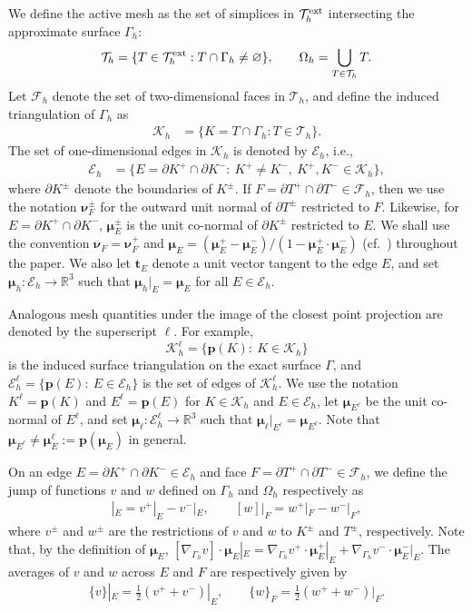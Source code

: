 \documentclass[10pt, a4paper]{amsart}
\newcommand{\bt}{{\bm t}}
\newcommand{\bp}{{\bm p}}
\newcommand{\bbR}{\mathbb{R}}
\newcommand{\p}{\partial}
\newcommand{\nab}{\nabla}
\newcommand{\bmu}{{\bm \mu}}
\newcommand{\calT}{\mathcal{T}}
\newcommand{\calE}{\mathcal{E}}
\newcommand{\calF}{\mathcal{F}}
\newcommand{\calK}{\mathcal{K}}
\newcommand{\bnu}{{\bm \nu}}
\theoremstyle{definition}
\theoremstyle{remark}
\theoremstyle{example}
\numberwithin{equation}{section}
\begin{document}
 We define the active mesh as
the set of simplices in $\calT_h^{\rm ext}$ intersecting the approximate surface $\Gamma_h$:
\[
\calT_h = \{T \in \calT^{\rm ext}_h: T \cap \Gamma_h \neq \varnothing\},\qquad
\Omega_h = \bigcup_{T\in \calT_h} T.
\]
%
Let $\calF_h$ denote the set of two-dimensional faces in $\calT_h$, and define
the induced triangulation of $\Gamma_h$ as
\begin{align*}
\calK_h
& = \{K = T \cap \Gamma_h: T \in \calT_h\}.
\end{align*}
The set of one-dimensional edges in $\calK_h$ is denoted by $\calE_h$, i.e.,
\begin{align*}
\calE_h
& = \{E = \partial K^+ \cap \partial K^-:\ K^+\neq K^-,\ K^+, K^- \in \calK_h\},
\end{align*}
where $\partial K^\pm$ denote the boundaries of $K^{\pm}$. 
If $F = \p T^+\cap \p T^-\in \calF_h$, then we use the notation
$\bnu_F^{\pm}$ for the outward unit normal of $\p T^{\pm}$ restricted to $F$.
Likewise, for $E = \p K^+\cap \p K^-$, $\bmu_E^{\pm}$ is the unit co-normal of $\p K^{\pm}$
restricted to $E$. We shall use the convention $\bnu_F = \bnu_F^+$ and $\bmu_E = (\bmu_E^+-\bmu^-_E)/(1-\bmu^+_E\cdot \bmu^-_E)$ (cf.~\cite{LarssonLarson17}) throughout the paper.
We also let $\bt_E$ denote a unit vector tangent to the edge $E$,
and set $\bmu_h:\calE_h\to \bbR^3$ such that $\bmu_h|_E = \bmu_E$
for all $E\in \calE_h$.
%

Analogous mesh quantities under
the image of the closest point projection
are denoted by the superscript $\ell$. For example,
\[
\calK_h^\ell = \{\bp(K):\ K\in \calK_h\}
\]
is the induced surface triangulation on the exact surface $\Gamma$,
and $\calE_h^\ell = \{\bp(E):\ E\in \calE_h\}$ is the set of edges
of $\calK_h^\ell$. We use the notation $K^\ell = \bp(K)$ 
and $E^\ell = \bp(E)$ for $K\in \calK_h$ and $E\in \calE_h$,
 let $\bmu_{E^\ell}$ be the unit co-normal of $E^\ell$,
 and set $\bmu_\ell:\calE_h^\ell\to \bbR^3$ such that $\bmu_\ell|_{E^\ell} = \bmu_{E^\ell}$.
Note that $\bmu_{E^\ell} \neq \bmu^\ell_E:=\bp(\bmu_E)$ in general.



On an edge $E = \p K^+\cap \p K^-\in \calE_h$
and face $F = \p T^+\cap \p T^-\in \calF_h$, we define the jump 
of functions $v$ and $w$ defined on $\Gamma_h$ and $\Omega_h$ respectively as
\begin{align*}
[v]|_E = v^+|_E-v^-|_E,\qquad [w]|_F = w^+|_F-w^-|_F,
\end{align*}
where $v^{\pm}$ and $w^{\pm}$ are the restrictions of $v$ and $w$ to $K^{\pm}$ and $T^{\pm}$, respectively.
Note that, by the definition of $\bmu_E$, $[\nab_{\Gamma_h} v] \cdot \bmu_E|_E = \nab_{\Gamma_h} v^+\cdot \bmu_E^+|_E+\nab_{\Gamma_h} v^-\cdot \bmu_E^-|_E$.
%
The averages of $v$ and $w$ across $E$ and $F$ are respectively given by
\begin{align*}
\{v\}|_E = \frac12 (v^+ +v^-)|_E,\qquad \{w\}_F = \frac12 (w^++ w^-)|_F.    
\end{align*}
\end{document}

